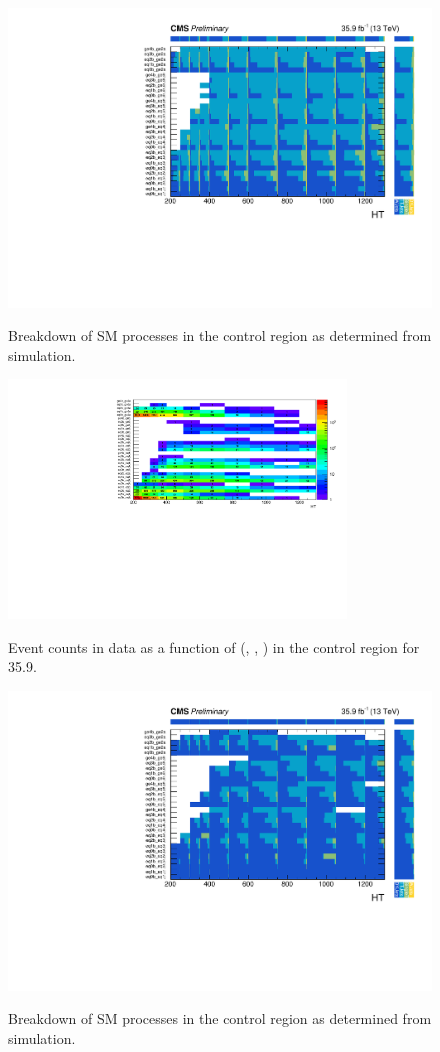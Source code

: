 \begin{figure}[h!]
  \centering
  \caption{Breakdown of SM processes in the \mj control region as
    determined from simulation.}
  \label{fig:breakdown-mj}
  \includegraphics[width=0.8\linewidth]{figures/control_regions/SingleMuSitV_MC_sampleComp}\\
\end{figure}

\clearpage
\begin{figure}[h!]
  \begin{center}
    {\includegraphics[width=0.8\textwidth]{figures/control_regions/DoubleMu.pdf}} 
    \caption{Event counts in data as a function of (\njet, \nb,
      \scalht) in the \mmj control region for 35.9\fbinv.}
    \label{fig:cr-counts-mmj}
  \end{center}
\end{figure}

\begin{figure}[h!]
  \centering
  \caption{Breakdown of SM processes in the \mmj control region as
    determined from simulation.}
  \label{fig:breakdown-mmj}
  \includegraphics[width=0.8\linewidth]{figures/control_regions/DoubleMuSitV_MC_sampleComp}\\
\end{figure}
